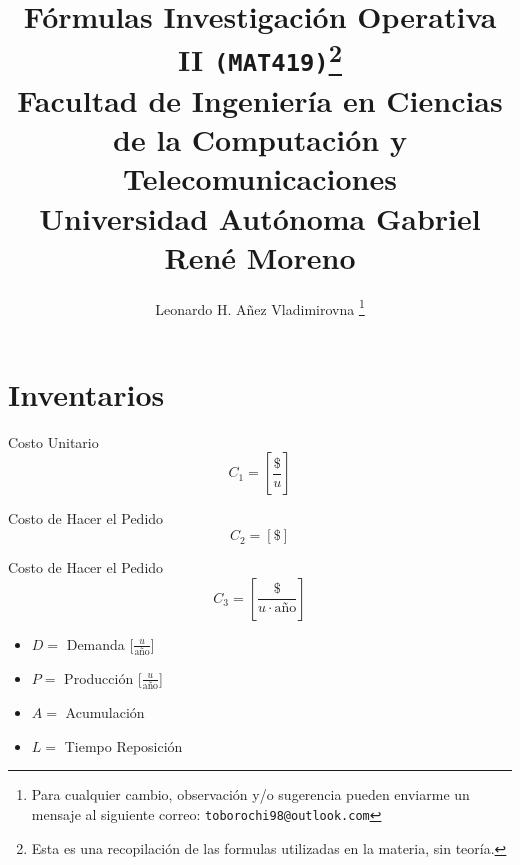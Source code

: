 \documentclass[10pt,letterpaper]{article}
\author{Leonardo H. Añez Vladimirovna \footnote{Para cualquier cambio, observación y/o sugerencia pueden enviarme un mensaje al siguiente correo: \texttt{toborochi98@outlook.com}}}
\title{Fórmulas Investigación Operativa II \texttt{(MAT419)}\footnote{Esta es una recopilación de las formulas utilizadas en la materia, sin teoría.}\\{\normalsize Facultad de Ingeniería en Ciencias de la Computación y Telecomunicaciones}\\ \vspace{-0.025cm}\normalsize Universidad Autónoma Gabriel René Moreno}
\begin{document}
\maketitle
\section{Inventarios}
\noindent
\begin{minipage}[t]{.2\textwidth}
\raggedright
Costo Unitario
$$C_1 = \left[\dfrac{\$}{u}\right]$$
\end{minipage}%
\begin{minipage}[t]{.2\textwidth}
\raggedright
Costo de Hacer el Pedido
$$C_2 = \left[\$ \right]$$
\end{minipage}%
\begin{minipage}[t]{.2\textwidth}
\raggedright
Costo de Hacer el Pedido
$$C_3 = \left[\dfrac{\$}{u\cdot \text{año}}\right]$$
\end{minipage}%
\begin{minipage}[t]{.4\textwidth}
\raggedright
\begin{itemize}
\item $D=$ Demanda  [$\frac{u}{\text{año}}$]
\item $P=$ Producción [$\frac{u}{\text{año}}$]
\item $A=$ Acumulación
\item $L=$ Tiempo Reposición
\end{itemize}
\end{minipage}
\end{document}
